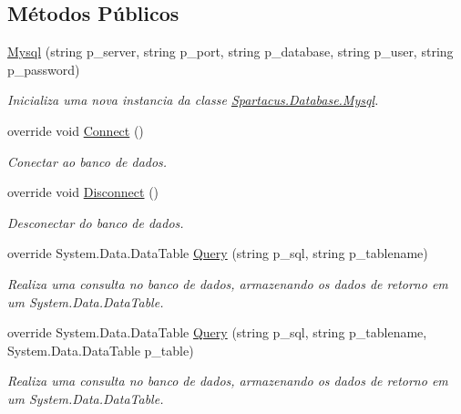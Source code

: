 \subsection*{Métodos Públicos}
\begin{DoxyCompactItemize}
\item 
\hyperlink{classSpartacus_1_1Database_1_1Mysql_aa1a7b4639cb22e84da677a4186efa060}{Mysql} (string p\+\_\+server, string p\+\_\+port, string p\+\_\+database, string p\+\_\+user, string p\+\_\+password)
\begin{DoxyCompactList}\small\item\em Inicializa uma nova instancia da classe \hyperlink{classSpartacus_1_1Database_1_1Mysql}{Spartacus.\+Database.\+Mysql}. \end{DoxyCompactList}\item 
override void \hyperlink{classSpartacus_1_1Database_1_1Mysql_a5169783f95c51db388b841b4bd9207f5}{Connect} ()
\begin{DoxyCompactList}\small\item\em Conectar ao banco de dados. \end{DoxyCompactList}\item 
override void \hyperlink{classSpartacus_1_1Database_1_1Mysql_ab7000e1b5ceedaaeaf3c824e22ec1b14}{Disconnect} ()
\begin{DoxyCompactList}\small\item\em Desconectar do banco de dados. \end{DoxyCompactList}\item 
override System.\+Data.\+Data\+Table \hyperlink{classSpartacus_1_1Database_1_1Mysql_a3546716a22fd53251603f2ab36d34410}{Query} (string p\+\_\+sql, string p\+\_\+tablename)
\begin{DoxyCompactList}\small\item\em Realiza uma consulta no banco de dados, armazenando os dados de retorno em um System.\+Data.\+Data\+Table. \end{DoxyCompactList}\item 
override System.\+Data.\+Data\+Table \hyperlink{classSpartacus_1_1Database_1_1Mysql_a2b7f2096a3ee819670c49ed41cf04f75}{Query} (string p\+\_\+sql, string p\+\_\+tablename, System.\+Data.\+Data\+Table p\+\_\+table)
\begin{DoxyCompactList}\small\item\em Realiza uma consulta no banco de dados, armazenando os dados de retorno em um System.\+Data.\+Data\+Table. \end{DoxyCompactList}\item 

\end{DoxyCompactItemize}
